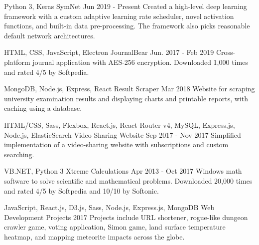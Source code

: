   \cventry
    {Python 3, Keras} %
    {SymNet} %
    {} %
    {Jun 2019 - Present} %
    {
      Created a high-level deep learning framework with a custom adaptive learning rate scheduler, novel activation functions, and built-in data pre-processing. The framework also picks reasonable default network architectures.
    }

  \cventry
    {HTML, CSS, JavaScript, Electron} %
    {JournalBear} %
    {} %
    {Jun. 2017 - Feb 2019} %
    {
      Cross-platform journal application with AES-256 encryption. Downloaded 1,000 times and rated 4/5 by Softpedia.
    }

  \cventry
    {MongoDB, Node.js, Express, React} %
    {Result Scraper} %
    {} %
    {Mar 2018} %
    {
      Website for scraping university examination results and displaying charts and printable reports, with caching using a database.
    }

  \cventry
    {HTML/CSS, Sass, Flexbox, React.js, React-Router v4, MySQL, Express.js, Node.js, ElasticSearch} %
    {Video Sharing Website} %
    {} %
    {Sep 2017 - Nov 2017} %
    {
      Simplified implementation of a video-sharing website with subscriptions and custom searching.
    }

  \cventry
    {VB.NET, Python 3} %
    {Xtreme Calculations} %
    {} %
    {Apr 2013 - Oct 2017} %
    {
      Windows math software to solve scientific and mathematical problems. Downloaded 20,000 times and rated 4/5 by Softpedia and 10/10 by Softonic.
    }

  \cventry
    {JavaScript, React.js, D3.js, Sass, Node.js, Express.js, MongoDB} %
    {Web Development Projects} %
    {} %
    {2017} %
    {
      Projects include URL shortener, rogue-like dungeon crawler game, voting application, Simon game, land surface temperature heatmap, and mapping meteorite impacts across the globe.
    }